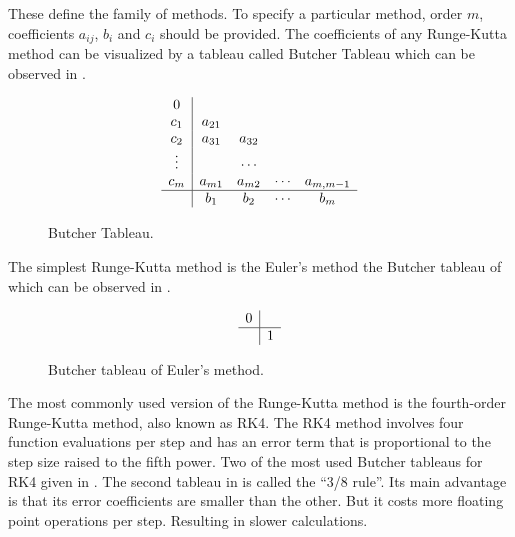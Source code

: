 \documentclass[a4paper,oneside,12pt]{report}
\numberwithin{equation}{chapter}
\begin{document}
\vspace{-35pt}
\noindent
These  define the family of methods. To specify a particular method, order $m$, coefficients $a_{ij}$, $b_i$ and $c_i$ should be provided.
The coefficients of any Runge-Kutta method can be visualized by a tableau called Butcher Tableau which can be observed in .
\begin{figure}[h!]
    \[ 
    \begin{array} 
        {c|cccc}
        0\\
        c_1 & a_{21} \\
        c_2 & a_{31} & a_{32}\\
        \vdots& & \cdots& \\
        c_m & a_{m1} & a_{m2} & \cdots & a_{m,m-1}\\
        \hline
        & b_1 & b_2 &\cdots & b_m
    \end{array}
    \]
    \vspace{-24pt}
    \caption{Butcher Tableau.}
    \label{fig:Butcher}
\end{figure}

\vspace{-13pt}
The simplest Runge-Kutta method is the Euler's method the Butcher tableau of which can be observed in .

\begin{figure}[H]
\[ 
    \begin{array} 
        {c|cccc}
        0\\
        \hline
        & 1
    \end{array}
\] 
\vspace{-24pt}
\caption{Butcher tableau of Euler's method.}
\label{fig:Butcher_euler}
\end{figure}

\vspace{-15pt}
The most commonly used version of the Runge-Kutta method is the fourth-order Runge-Kutta method, also known as RK4. 
The RK4 method involves four function evaluations per step and has an error term that is proportional to the step size raised to the fifth power.
Two of the most used Butcher tableaus for RK4 given in .
The second tableau in  is called the ``3/8 rule''. Its main advantage is that its error coefficients are smaller than the other. But it costs more floating point operations per step. 
Resulting in slower calculations. 
\end{document}
